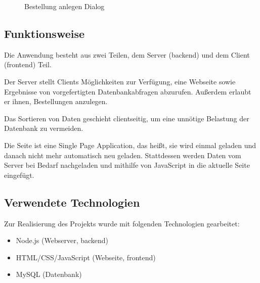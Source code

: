 \documentclass[12pt,pdftex,parskip=half]{scrartcl}
\begin{document}
        \begin{figure}[!htb]
            \centering
            \caption{Bestellung anlegen Dialog}
        \end{figure}

        \newpage


    \subsection{Funktionsweise}

    Die Anwendung besteht aus zwei Teilen, dem Server (backend) und dem Client (frontend) Teil.

    Der Server stellt Clients Möglichkeiten zur Verfügung, eine Webseite sowie Ergebnisse von vorgefertigten Datenbankabfragen abzurufen. Außerdem erlaubt er ihnen, Bestellungen anzulegen.

    Das Sortieren von Daten geschieht clientseitig, um eine unnötige Belastung der Datenbank zu vermeiden.

    Die Seite ist eine Single Page Application, das heißt, sie wird einmal geladen und danach nicht mehr automatisch neu geladen. Stattdessen werden Daten vom Server bei Bedarf nachgeladen und mithilfe von JavaScript in die aktuelle Seite eingefügt.


    \subsection{Verwendete Technologien}
    Zur Realisierung des Projekts wurde mit folgenden Technologien gearbeitet:

    \begin{itemize}
        \item Node.js (Webserver, backend) %
        \item HTML/CSS/JavaScript (Webseite, frontend)
        \item MySQL (Datenbank) %
    \end{itemize}
\end{document}
